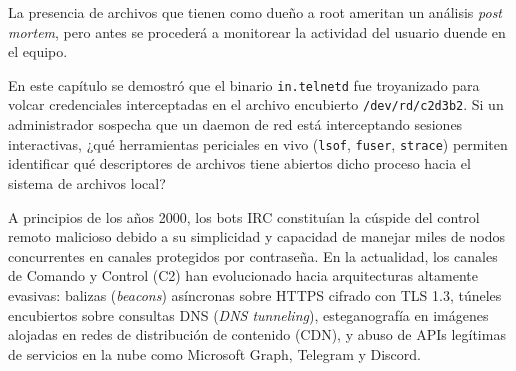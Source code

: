 \vspace{1em}
 
La presencia de archivos que tienen como dueño a root ameritan un
análisis \emph{post mortem}, pero antes se procederá a monitorear la
actividad del usuario duende en el equipo.

\begin{retoforense}
En este capítulo se demostró que el binario \texttt{in.telnetd} fue troyanizado para volcar credenciales interceptadas en el archivo encubierto \texttt{/dev/rd/c2d3b2}. Si un administrador sospecha que un daemon de red está interceptando sesiones interactivas, ¿qué herramientas periciales en vivo (\texttt{lsof}, \texttt{fuser}, \texttt{strace}) permiten identificar qué descriptores de archivos tiene abiertos dicho proceso hacia el sistema de archivos local?
\end{retoforense}

\begin{perspectiva20}
A principios de los años 2000, los bots IRC constituían la cúspide del control remoto malicioso debido a su simplicidad y capacidad de manejar miles de nodos concurrentes en canales protegidos por contraseña. En la actualidad, los canales de Comando y Control (C2) han evolucionado hacia arquitecturas altamente evasivas: balizas (\textit{beacons}) asíncronas sobre HTTPS cifrado con TLS 1.3, túneles encubiertos sobre consultas DNS (\textit{DNS tunneling}), esteganografía en imágenes alojadas en redes de distribución de contenido (CDN), y abuso de APIs legítimas de servicios en la nube como Microsoft Graph, Telegram y Discord.
\end{perspectiva20}

